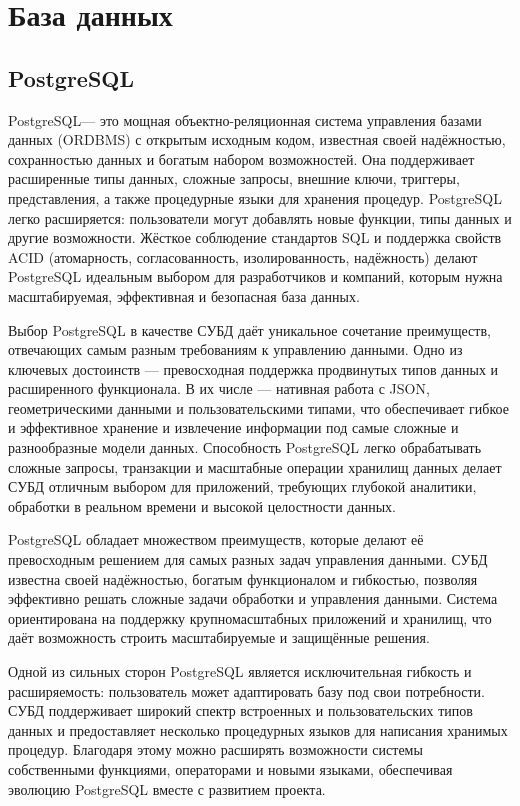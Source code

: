 \section{База данных}
\subsection{PostgreSQL}

PostgreSQL— это мощная объектно-реляционная система управления базами данных (ORDBMS) с открытым исходным кодом, известная своей надёжностью, сохранностью данных и богатым набором возможностей. Она поддерживает расширенные типы данных, сложные запросы, внешние ключи, триггеры, представления, а также процедурные языки для хранения процедур. PostgreSQL легко расширяется: пользователи могут добавлять новые функции, типы данных и другие возможности. Жёсткое соблюдение стандартов SQL и поддержка свойств ACID (атомарность, согласованность, изолированность, надёжность) делают PostgreSQL идеальным выбором для разработчиков и компаний, которым нужна масштабируемая, эффективная и безопасная база данных.

Выбор PostgreSQL в качестве СУБД даёт уникальное сочетание преимуществ, отвечающих самым разным требованиям к управлению данными. Одно из ключевых достоинств — превосходная поддержка продвинутых типов данных и расширенного функционала. В их числе — нативная работа с JSON, геометрическими данными и пользовательскими типами, что обеспечивает гибкое и эффективное хранение и извлечение информации под самые сложные и разнообразные модели данных. Способность PostgreSQL легко обрабатывать сложные запросы, транзакции и масштабные операции хранилищ данных делает СУБД отличным выбором для приложений, требующих глубокой аналитики, обработки в реальном времени и высокой целостности данных.

PostgreSQL обладает множеством преимуществ, которые делают её превосходным решением для самых разных задач управления данными. СУБД известна своей надёжностью, богатым функционалом и гибкостью, позволяя эффективно решать сложные задачи обработки и управления данными. Система ориентирована на поддержку крупномасштабных приложений и хранилищ, что даёт возможность строить масштабируемые и защищённые решения.

Одной из сильных сторон PostgreSQL является исключительная гибкость и расширяемость: пользователь может адаптировать базу под свои потребности. СУБД поддерживает широкий спектр встроенных и пользовательских типов данных и предоставляет несколько процедурных языков для написания хранимых процедур. Благодаря этому можно расширять возможности системы собственными функциями, операторами и новыми языками, обеспечивая эволюцию PostgreSQL вместе с развитием проекта.

